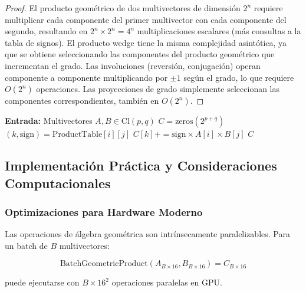 \begin{proof}
El producto geométrico de dos multivectores de dimensión $2^n$ requiere multiplicar cada componente del primer multivector con cada componente del segundo, resultando en $2^n \times 2^n = 4^n$ multiplicaciones escalares (más consultas a la tabla de signos). El producto wedge tiene la misma complejidad asintótica, ya que se obtiene seleccionando las componentes del producto geométrico que incrementan el grado. Las involuciones (reversión, conjugación) operan componente a componente multiplicando por $\pm 1$ según el grado, lo que requiere $O(2^n)$ operaciones. Las proyecciones de grado simplemente seleccionan las componentes correspondientes, también en $O(2^n)$.
\end{proof}

\begin{algorithm}[H]
\caption{Producto Geométrico Eficiente}
\label{alg:producto_geometrico_eficiente}
\begin{algorithmic}[1]
    \State \textbf{Entrada:} Multivectores $A, B \in \text{Cl}(p,q)$
        \State $C = \text{zeros}(2^{p+q})$
                \State $(k, \text{sign}) = \text{ProductTable}[i][j]$
                \State $C[k] += \text{sign} \times A[i] \times B[j]$
            \EndFor
        \EndFor
        \State \Return $C$
    \EndFunction
\end{algorithmic}
\end{algorithm}

\subsection{Implementación Práctica y Consideraciones Computacionales}

\subsubsection{Optimizaciones para Hardware Moderno}

\begin{definition}\label{def:paralelizacion_ga}
Las operaciones de álgebra geométrica son intrínsecamente paralelizables. Para un batch de $B$ multivectores:

\begin{equation}
    \text{BatchGeometricProduct}(A_{B \times 16}, B_{B \times 16}) = C_{B \times 16}
\end{equation}

puede ejecutarse con $B \times 16^2$ operaciones paralelas en GPU.
\end{definition}

